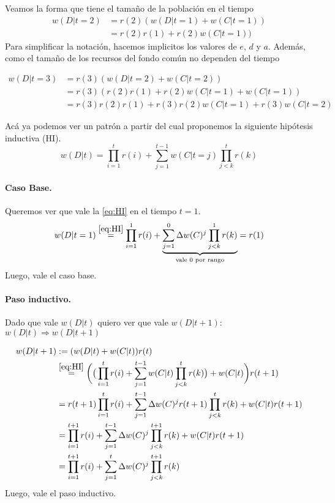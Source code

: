 \documentclass[a4paper,10pt]{article}
\begin{document}
Veamos la forma que tiene el tamaño de la población en el tiempo
\begin{align}
w(D|t=2) & = r(2) (w(D|t=1) + w(C|t=1)) \\
& = r(2)r(1) + r(2)w(C|t=1))
\end{align}
Para simplificar la notación, hacemos implicitos los valores de $e$, $d$ y $a$.
Además, como el tamaño de los recursos del fondo común no dependen del tiempo

\begin{align}
w(D|t=3) & = r(3) (w(D|t=2)+w(C|t=2)) \\
& = r(3) (r(2)r(1) + r(2)w(C|t=1) + w(C|t=1) ) \\
& = r(3)r(2)r(1) + r(3)r(2)w(C|t=1) + r(3)w(C|t=2) 
\end{align}

Acá ya podemos ver un patrón a partir del cual proponemos la siguiente hipótesis inductiva (HI).
\begin{equation} \label{eq:HI} \tag{HI} 
w(D|t) = \prod^t_{i=1} r(i) + \sum^{t-1}_{j=1} w(C|t=j)
\prod^t_{j<k} r(k)
\end{equation}

\paragraph{Caso Base.} Queremos ver que vale la \ref{eq:HI} en el tiempo $t=1$.
\begin{equation} 
w(D|t=1) \overset{\ref{eq:HI}}{=} \prod^1_{i=1} r(i) + \underbrace{\sum^{0}_{j=1} \Delta w(C)^j \prod^1_{j<k} r(k) }_{\text{vale $0$ por rango}} = r(1)
\end{equation}
Luego, vale el caso base.

\paragraph{Paso inductivo.} Dado que vale $w(D|t)$ quiero ver que vale $w(D|t+1)$: $w(D|t) \Rightarrow w(D|t+1)$

\begin{equation}
\begin{split}
w(D|t+1) &:= (w(D|t) + w(C|t)) r(t)  \\
& \overset{\ref{eq:HI}}{=} \bigg( \big(\prod^t_{i=1} r(i) + \sum^{t-1}_{j=1} w(C|t) \prod^t_{j<k} r(k) \big)+ w(C|t) \bigg) r(t+1) \\
& = r(t+1) \prod^t_{i=1} r(i) + \sum^{t-1}_{j=1} \Delta w(C)^j r(t+1) \prod^t_{j<k} r(k) + w(C|t)  r(t+1) \\ 
& = \prod^{t+1}_{i=1} r(i) + \sum^{t-1}_{j=1} \Delta w(C)^j  \prod^{t+1}_{j<k} r(k) + w(C|t)  r(t+1)  \\
& = \prod^{t+1}_{i=1} r(i) + \sum^t_{j=1} \Delta w(C)^j  \prod^{t+1}_{j<k} r(k) 
\end{split}
\end{equation}
Luego, vale el paso inductivo. 
\end{document}

